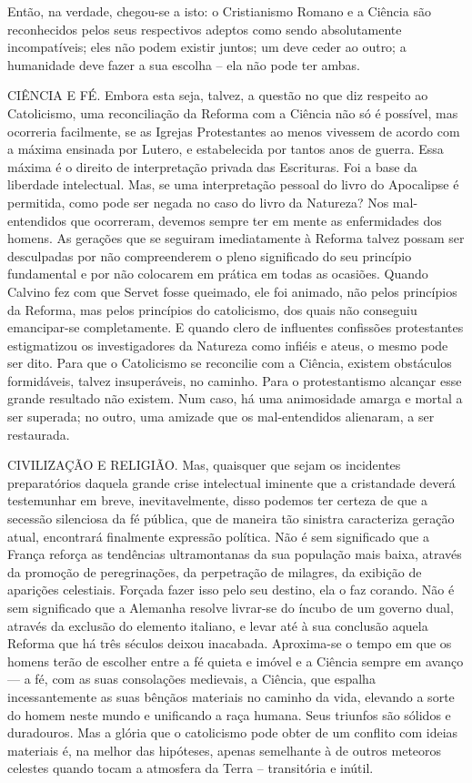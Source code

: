 \documentclass[11pt,a5paper,twoside,openany]{book}
\begin{document}
Então, na verdade, chegou-se a isto: o Cristianismo Romano e a Ciência são reconhecidos pelos seus respectivos adeptos como sendo absolutamente incompatíveis; eles não podem existir juntos; um deve ceder ao outro; a humanidade deve fazer a sua escolha – ela não pode ter ambas.

CIÊNCIA E FÉ. Embora esta seja, talvez, a questão no que diz respeito ao Catolicismo, uma reconciliação da Reforma com a Ciência não só é possível, mas ocorreria facilmente, se as Igrejas Protestantes ao menos vivessem de acordo com a máxima ensinada por Lutero, e estabelecida por tantos anos de guerra. Essa máxima é o direito de interpretação privada das Escrituras. Foi a base da liberdade intelectual. Mas, se uma interpretação pessoal do livro do Apocalipse é permitida, como pode ser negada no caso do livro da Natureza? Nos mal-entendidos que ocorreram, devemos sempre ter em mente as enfermidades dos homens. As gerações que se seguiram imediatamente à Reforma talvez possam ser desculpadas por não compreenderem o pleno significado do seu princípio fundamental e por não colocarem em prática em todas as ocasiões. Quando Calvino fez com que Servet fosse queimado, ele foi animado, não pelos princípios da Reforma, mas pelos princípios do catolicismo, dos quais não conseguiu emancipar-se completamente. E quando clero de influentes confissões protestantes estigmatizou os investigadores da Natureza como infiéis e ateus, o mesmo pode ser dito. Para que o Catolicismo se reconcilie com a Ciência, existem obstáculos formidáveis, talvez insuperáveis, no caminho. Para o protestantismo alcançar esse grande resultado não existem. Num caso, há uma animosidade amarga e mortal a ser superada; no outro, uma amizade que os mal-entendidos alienaram, a ser restaurada.

CIVILIZAÇÃO E RELIGIÃO. Mas, quaisquer que sejam os incidentes preparatórios daquela grande crise intelectual iminente que a cristandade deverá testemunhar em breve, inevitavelmente, disso podemos ter certeza de que a secessão silenciosa da fé pública, que de maneira tão sinistra caracteriza geração atual, encontrará finalmente expressão política. Não é sem significado que a França reforça as tendências ultramontanas da sua população mais baixa, através da promoção de peregrinações, da perpetração de milagres, da exibição de aparições celestiais. Forçada fazer isso pelo seu destino, ela o faz corando. Não é sem significado que a Alemanha resolve livrar-se do íncubo de um governo dual, através da exclusão do elemento italiano, e levar até à sua conclusão aquela Reforma que há três séculos deixou inacabada. Aproxima-se o tempo em que os homens terão de escolher entre a fé quieta e imóvel e a Ciência sempre em avanço — a fé, com as suas consolações medievais, a Ciência, que espalha incessantemente as suas bênçãos materiais no caminho da vida, elevando a sorte do homem neste mundo e unificando a raça humana. Seus triunfos são sólidos e duradouros. Mas a glória que o catolicismo pode obter de um conflito com ideias materiais é, na melhor das hipóteses, apenas semelhante à de outros meteoros celestes quando tocam a atmosfera da Terra – transitória e inútil.
\end{document}
